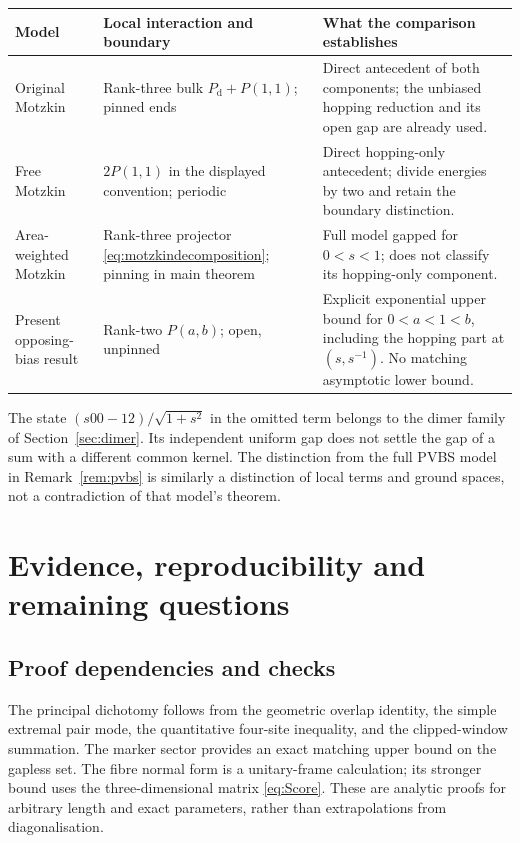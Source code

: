 \documentclass[11pt,a4paper]{article}
\theoremstyle{remark}\newtheorem{remark}[theorem]{Remark}
\begin{document}
\begin{center}
\small
\begin{tabular}{p{}p{}p{}}
\toprule
Model & Local interaction and boundary & What the comparison establishes\\
\midrule
Original Motzkin \cite{Motzkin} & Rank-three bulk $P_{\mathrm d}+P(1,1)$; pinned ends & Direct antecedent of both components; the unbiased hopping reduction and its open gap are already used.\\[3pt]
Free Motzkin \cite{FreeMotzkin} & $2P(1,1)$ in the displayed convention; periodic & Direct hopping-only antecedent; divide energies by two and retain the boundary distinction.\\[3pt]
Area-weighted Motzkin \cite{ALM} & Rank-three projector \eqref{eq:motzkindecomposition}; pinning in main theorem & Full model gapped for $0<s<1$; does not classify its hopping-only component.\\[3pt]
Present opposing-bias result & Rank-two $P(a,b)$; open, unpinned & Explicit exponential upper bound for $0<a<1<b$, including the hopping part at $(s,s^{-1})$. No matching asymptotic lower bound.\\
\bottomrule
\end{tabular}
\end{center}
The state $(s00-12)/\sqrt{1+s^2}$ in the omitted term belongs to the dimer family of Section~\ref{sec:dimer}. Its independent uniform gap does not settle the gap of a sum with a different common kernel. The distinction from the full PVBS model in Remark~\ref{rem:pvbs} is similarly a distinction of local terms and ground spaces, not a contradiction of that model's theorem.

\section{Evidence, reproducibility and remaining questions}\label{sec:evidence}
\subsection{Proof dependencies and checks}
The principal dichotomy follows from the geometric overlap identity, the simple extremal pair mode, the quantitative four-site inequality, and the clipped-window summation. The marker sector provides an exact matching upper bound on the gapless set. The fibre normal form is a unitary-frame calculation; its stronger bound uses the three-dimensional matrix \eqref{eq:Score}. These are analytic proofs for arbitrary length and exact parameters, rather than extrapolations from diagonalisation.
\end{document}
